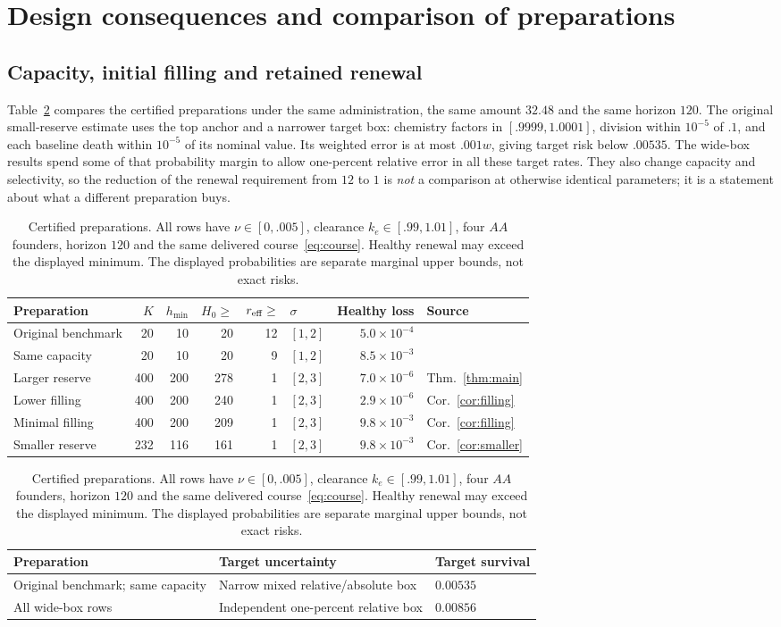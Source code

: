 \section{Design consequences and comparison of preparations}\label{sec:design}
\subsection{Capacity, initial filling and retained renewal}
Table~\ref{tab:examples} compares the certified preparations under the same administration, the same amount $32.48$ and the same horizon $120$. The original small-reserve estimate uses the top anchor and a narrower target box: chemistry factors in $[.9999,1.0001]$, division within $10^{-5}$ of $.1$, and each baseline death within $10^{-5}$ of its nominal value. Its weighted error is at most $.001w$, giving target risk below $.00535$. The wide-box results spend some of that probability margin to allow one-percent relative error in all these target rates. They also change capacity and selectivity, so the reduction of the renewal requirement from $12$ to $1$ is \emph{not} a comparison at otherwise identical parameters; it is a statement about what a different preparation buys.

\begin{table}[tb]
\centering\small
\caption{Certified preparations. All rows have $\nu\in[0,.005]$, clearance $k_e\in[.99,1.01]$, four $AA$ founders, horizon $120$ and the same delivered course~\eqref{eq:course}. Healthy renewal may exceed the displayed minimum. The displayed probabilities are separate marginal upper bounds, not exact risks.}\label{tab:examples}
\setlength{\tabcolsep}{4pt}
\begin{tabular}{@{}lrrrrlrl@{}}
\toprule
Preparation & $K$ & $h_{\min}$ & $H_0\ge$ & $r_{\mathrm{eff}}\ge$ & $\sigma$ & Healthy loss & Source\\
\midrule
Original benchmark    & 20  & 10  & 20  & 12 & $[1,2]$ & $5.0\times10^{-4}$ & \\
Same capacity         & 20  & 10  & 20  & 9  & $[1,2]$ & $8.5\times10^{-3}$ & \\
Larger reserve        & 400 & 200 & 278 & 1  & $[2,3]$ & $7.0\times10^{-6}$ & Thm.~\ref{thm:main}\\
Lower filling         & 400 & 200 & 240 & 1  & $[2,3]$ & $2.9\times10^{-6}$ & Cor.~\ref{cor:filling}\\
Minimal filling       & 400 & 200 & 209 & 1  & $[2,3]$ & $9.8\times10^{-3}$ & Cor.~\ref{cor:filling}\\
Smaller reserve       & 232 & 116 & 161 & 1  & $[2,3]$ & $9.8\times10^{-3}$ & Cor.~\ref{cor:smaller}\\
\bottomrule
\end{tabular}
\medskip
\begin{tabular}{@{}lll@{}}
\toprule
Preparation & Target uncertainty & Target survival\\
\midrule
Original benchmark; same capacity & Narrow mixed relative/absolute box & $0.00535$\\
All wide-box rows & Independent one-percent relative box & $0.00856$\\
\bottomrule
\end{tabular}
\end{table}

